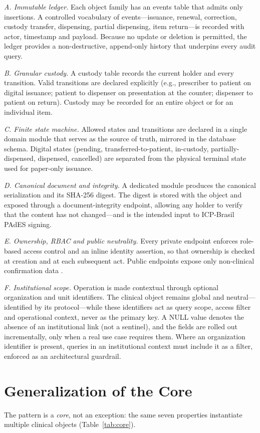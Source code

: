 \documentclass[conference]{IEEEtran}
\begin{document}
\textit{A. Immutable ledger.} Each object family has an events table that admits only insertions. A controlled vocabulary of events---issuance, renewal, correction, custody transfer, dispensing, partial dispensing, item return---is recorded with actor, timestamp and payload. Because no update or deletion is permitted, the ledger provides a non-destructive, append-only history that underpins every audit query.

\textit{B. Granular custody.} A custody table records the current holder and every transition. Valid transitions are declared explicitly (e.g., prescriber to patient on digital issuance; patient to dispenser on presentation at the counter; dispenser to patient on return). Custody may be recorded for an entire object or for an individual item.

\textit{C. Finite state machine.} Allowed states and transitions are declared in a single domain module that serves as the source of truth, mirrored in the database schema. Digital states (pending, transferred-to-patient, in-custody, partially-dispensed, dispensed, cancelled) are separated from the physical terminal state used for paper-only issuance.

\textit{D. Canonical document and integrity.} A dedicated module produces the canonical serialization and its SHA-256 digest. The digest is stored with the object and exposed through a document-integrity endpoint, allowing any holder to verify that the content has not changed---and is the intended input to ICP-Brasil PAdES signing.

\textit{E. Ownership, RBAC and public neutrality.} Every private endpoint enforces role-based access control and an inline identity assertion, so that ownership is checked at creation and at each subsequent act. Public endpoints expose only non-clinical confirmation data \cite{lgpd}.

\textit{F. Institutional scope.} Operation is made contextual through optional organization and unit identifiers. The clinical object remains global and neutral---identified by its protocol---while these identifiers act as query scope, access filter and operational context, never as the primary key. A NULL value denotes the absence of an institutional link (not a sentinel), and the fields are rolled out incrementally, only when a real use case requires them. Where an organization identifier is present, queries in an institutional context must include it as a filter, enforced as an architectural guardrail.

\section{Generalization of the Core}\label{sec:gen}
The pattern is a \emph{core}, not an exception: the same seven properties instantiate multiple clinical objects (Table~\ref{tab:core}).
\end{document}
